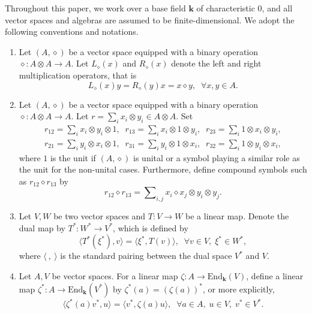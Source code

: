 \documentclass[12pt, reqno, a4paper]{amsart}
\theoremstyle{definition}
\newcommand{\End}{\mathrm{End}}
\begin{document}
Throughout this paper, we work over a base field $\mathbf{k}$ of characteristic $0$, and all vector spaces and algebras are assumed to be finite-dimensional.
We adopt the following conventions and notations.
\begin{enumerate}
	\item[(i)]
	      Let $(A, \diamond)$ be a vector space equipped with a binary operation $\diamond: A \otimes A \to A$.
	      Let $L_\diamond(x)$ and $R_\diamond(x)$ denote the left and right multiplication operators, that is
	      \begin{equation*}
		      L_\diamond(x)y = R_\diamond(y)x = x \diamond y, \;\; \forall x, y \in A.
	      \end{equation*}


	\item[(ii)]
	      Let $(A, \diamond)$ be a vector space equipped with a binary operation $\diamond: A \otimes A \to A$.
	      Let $r = \sum_{i} x_i \otimes y_i \in A \otimes A$.
	      Set
	      \begin{align*}
		      r_{12} = \sum\nolimits_{i} x_i \otimes y_i \otimes 1, \;\;
		      r_{13} = \sum\nolimits_{i} x_i \otimes 1 \otimes y_i, \;\;
		      r_{23} = \sum\nolimits_{i} 1 \otimes x_i \otimes y_i, \\
		      r_{21} = \sum\nolimits_{i} y_i \otimes x_i \otimes 1, \;\;
		      r_{31} = \sum\nolimits_{i} y_i \otimes 1 \otimes x_i, \;\;
		      r_{32} = \sum\nolimits_{i} 1 \otimes y_i \otimes x_i,
	      \end{align*}
	      where $1$ is the unit if $(A, \diamond)$ is unital or a symbol playing a similar role as the unit for the non-unital cases.
	      Furthermore, define compound symbols such as $r_{12} \diamond r_{13}$ by
	      \begin{equation*}
		      r_{12} \diamond r_{13} = \sum\nolimits_{i, j} x_i \diamond x_j \otimes y_i \otimes y_j.
	      \end{equation*}

 



	\item[(iii)]
	      Let $V, W$ be two vector spaces and $T: V \to W$ be a linear map.
	      Denote the dual map by $T^*: W^* \to V^*$, which is defined by
	      \begin{equation*}
		      \langle T^*(\xi^*), v \rangle = \langle \xi^*, T(v) \rangle, \;\; \forall v \in V, \; \xi^* \in W^*,
	      \end{equation*}
		  where $\langle \ ,\ \rangle$ is the standard pairing between the dual space $V^*$ and $V$.

	\item[(iv)]
	      Let $A, V$ be vector spaces.
	      For a linear map $\zeta: A \to \End_{\mathbf{k}}(V)$, define a linear map $\zeta^*: A \to \End_{\mathbf{k}}(V^*)$ by $\zeta^*(a) = (\zeta(a))^*$, or more explicitly,
	      \begin{equation*}
		      \langle \zeta^*(a)v^*, u\rangle = \langle v^*, \zeta(a) u\rangle, \;\; \forall a \in A, \; u \in V, \; v^* \in V^*.
	      \end{equation*}


\end{enumerate}
\end{document}
